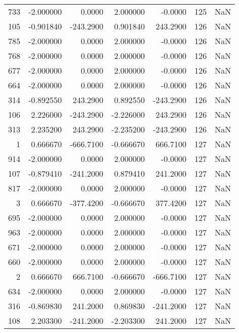 \begin{tabular}{rrrrrrr}
 733 &   -2.000000 &    0.0000 &    2.000000 &     -0.0000 &         125 & NaN \\
 105 &   -0.901840 & -243.2900 &    0.901840 &    243.2900 &         126 & NaN \\
 785 &   -2.000000 &    0.0000 &    2.000000 &     -0.0000 &         126 & NaN \\
 768 &   -2.000000 &    0.0000 &    2.000000 &     -0.0000 &         126 & NaN \\
 677 &   -2.000000 &    0.0000 &    2.000000 &     -0.0000 &         126 & NaN \\
 664 &   -2.000000 &    0.0000 &    2.000000 &     -0.0000 &         126 & NaN \\
 314 &   -0.892550 &  243.2900 &    0.892550 &   -243.2900 &         126 & NaN \\
 106 &    2.226000 & -243.2900 &   -2.226000 &    243.2900 &         126 & NaN \\
 313 &    2.235200 &  243.2900 &   -2.235200 &   -243.2900 &         126 & NaN \\
   1 &    0.666670 & -666.7100 &   -0.666670 &    666.7100 &         127 & NaN \\
 914 &   -2.000000 &    0.0000 &    2.000000 &     -0.0000 &         127 & NaN \\
 107 &   -0.879410 & -241.2000 &    0.879410 &    241.2000 &         127 & NaN \\
 817 &   -2.000000 &    0.0000 &    2.000000 &     -0.0000 &         127 & NaN \\
   3 &    0.666670 & -377.4200 &   -0.666670 &    377.4200 &         127 & NaN \\
 695 &   -2.000000 &    0.0000 &    2.000000 &     -0.0000 &         127 & NaN \\
 963 &   -2.000000 &    0.0000 &    2.000000 &     -0.0000 &         127 & NaN \\
 671 &   -2.000000 &    0.0000 &    2.000000 &     -0.0000 &         127 & NaN \\
 660 &   -2.000000 &    0.0000 &    2.000000 &     -0.0000 &         127 & NaN \\
   2 &    0.666670 &  666.7100 &   -0.666670 &   -666.7100 &         127 & NaN \\
 634 &   -2.000000 &    0.0000 &    2.000000 &     -0.0000 &         127 & NaN \\
 316 &   -0.869830 &  241.2000 &    0.869830 &   -241.2000 &         127 & NaN \\
 108 &    2.203300 & -241.2000 &   -2.203300 &    241.2000 &         127 & NaN \\

\end{tabular}
